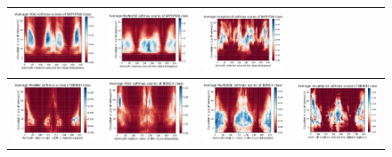 \begin{figure}[h]
\begin{tabular}{||c|c|c|c||}
\includegraphics[width = 4cm]{supimages/nms2d/VGG_bathtub_Average.pdf}&
\includegraphics[width = 4cm]{supimages/nms2d/ResNet50_bathtub_Average.pdf}&
\includegraphics[width = 4cm]{supimages/nms2d/Inceptionv3_bathtub_Average.pdf}\\ \hline
\includegraphics[width = 4cm]{supimages/nms2d/AlexNet_bench_Average.pdf}&
\includegraphics[width = 4cm]{supimages/nms2d/VGG_bench_Average.pdf}&
\includegraphics[width = 4cm]{supimages/nms2d/ResNet50_bench_Average.pdf}&
\includegraphics[width = 4cm]{supimages/nms2d/Inceptionv3_bench_Average.pdf}\\ \hline

\end{tabular}
\end{figure}

